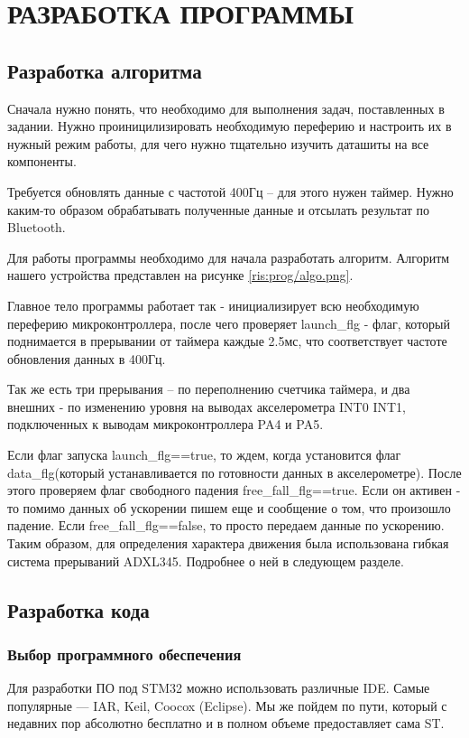 \begin{sloppypar} %
\newpage %
\section{РАЗРАБОТКА ПРОГРАММЫ} %
\subsection{Разработка алгоритма}
Сначала нужно понять, что необходимо для выполнения задач, поставленных в задании. Нужно проиницилизировать необходимую переферию и настроить их в нужный режим работы, для чего нужно тщательно изучить даташиты на все компоненты.

Требуется обновлять данные с частотой 400Гц --  для этого нужен таймер. Нужно каким-то образом обрабатывать полученные данные и отсылать результат по Bluetooth. 

Для работы программы необходимо для начала разработать алгоритм. Алгоритм нашего устройства представлен на рисунке \ref{ris:prog/algo.png}.


Главное тело программы работает так -  инициализирует всю необходимую переферию микроконтроллера, после чего проверяет launch\_flg - флаг, который поднимается в прерывании от таймера каждые 2.5мс, что соответствует частоте обновления данных в 400Гц. 


Так же есть три прерывания -- по переполнению счетчика таймера, и два внешних - по изменению уровня на выводах акселерометра INT0 INT1, подключенных к выводам микроконтроллера PA4 и PA5.


Если флаг запуска  launch\_flg==true, то ждем, когда установится флаг data\_flg(который устанавливается по готовности данных в акселерометре). После этого проверяем флаг свободного падения free\_fall\_flg==true. Если он активен - то помимо данных об ускорении пишем еще и сообщение о том, что произошло падение. Если free\_fall\_flg==false, то просто передаем данные по ускорению. Таким образом, для определения характера движения была использована гибкая система прерываний ADXL345. Подробнее о ней в следующем разделе.

\subsection{Разработка кода}

\subsubsection{Выбор программного обеспечения}
Для разработки ПО под STM32 можно использовать различные IDE. Самые популярные — IAR, Keil, Coocox (Eclipse). Мы же пойдем по пути, который с недавних пор абсолютно бесплатно и в полном объеме предоставляет сама ST.



\end{sloppypar}
